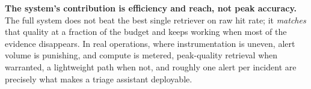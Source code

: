 \noindent\textbf{The system's contribution is efficiency and reach, not peak
accuracy.} The full system does not beat the best single retriever on raw hit
rate; it \emph{matches} that quality at a fraction of the budget and keeps
working when most of the evidence disappears. In real operations, where
instrumentation is uneven, alert volume is punishing, and compute is metered,
peak-quality retrieval when warranted, a lightweight path when not,
and roughly one alert per incident are precisely what makes a triage
assistant deployable.

